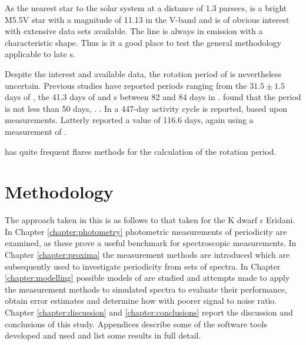 As the nearest star to the solar system at a distance of 1.3 parsecs, {\prox} is a bright M5.5V star with a magnitude of
11.13 in the V-band and is of obvious interest with extensive data sets available. The {\ha} line is always in emission
with a characteristic shape. Thus is it a good place to test the general methodology applicable to late \rdwarf s.

Despite the interest and available data, the rotation period of {\prox} is nevertheless uncertain.  Previous studies
have reported periods ranging from the $ 31.5 \pm 1.5 $ days of \citet{guinan96}, the 41.3 days of \citet{benedict93}
and s between 82 and 84 days in \citealt{benedict92,benedict98}.  \citet{kurster99} found that the period is not less
than 50 days, . .  In \citet{cincunegui07} a 447-day activity cycle is reported,
based upon {\ha} measurements. Latterly \citet[Table 3]{suarezmascareno15} reported a value of 116.6 days, again using a
measurement of {\ha}.

{\prox} has quite frequent flares  methods for the calculation of the rotation period.

\section{Methodology}
\protect\label{section:methodology}

The approach taken in this {\paperorthesis} is as follows  to that taken 
\citet{giguere16} for the K dwarf $\epsilon$ Eridani. In Chapter \ref{chapter:photometry} photometric measurements of
 periodicity  {\prox} are examined, as these prove a useful benchmark for
spectroscopic measurements. In Chapter \ref{chapter:proxima} the measurement methods are introduced which are
subsequently used to investigate periodicity from sets of spectra. In Chapter \ref{chapter:modelling} possible models of
{\prox} are studied and attempts  made to apply the measurement methods to simulated spectra to evaluate their
performance, obtain error estimates and determine how  with poorer signal to noise ratio. Chapter
\ref{chapter:discussion} and \ref{chapter:conclusions} report the discussion and conclusions of this study. Appendices
describe some of the software tools developed and used and list some results in full detail.
